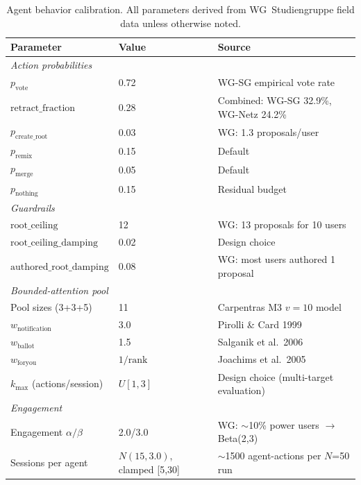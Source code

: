 \documentclass[a4paper, 12pt, twoside]{iviathesis}
\begin{document}
\begin{table}[ht]
\centering
\caption{Agent behavior calibration. All parameters derived from WG~Studiengruppe field data unless otherwise noted.}
\label{tab:sim-calibration}
\small
\begin{tabular}{l l p{5.5cm}}
\toprule
\textbf{Parameter} & \textbf{Value} & \textbf{Source} \\
\midrule
\multicolumn{3}{l}{\textit{Action probabilities}} \\
$p_{\text{vote}}$ & 0.72 & WG-SG empirical vote rate \\
$\text{retract\_fraction}$ & 0.28 & Combined: WG-SG 32.9\%, WG-Netz 24.2\% \\
$p_{\text{create\_root}}$ & 0.03 & WG: 1.3 proposals/user \\
$p_{\text{remix}}$ & 0.15 & Default \\
$p_{\text{merge}}$ & 0.05 & Default \\
$p_{\text{nothing}}$ & 0.15 & Residual budget \\
\midrule
\multicolumn{3}{l}{\textit{Guardrails}} \\
$\text{root\_ceiling}$ & 12 & WG: 13 proposals for 10 users \\
$\text{root\_ceiling\_damping}$ & 0.02 & Design choice \\
$\text{authored\_root\_damping}$ & 0.08 & WG: most users authored 1 proposal \\
\midrule
\multicolumn{3}{l}{\textit{Bounded-attention pool}} \\
Pool sizes (3+3+5) & 11 & Carpentras M3 $v=10$ model \\
$w_{\text{notification}}$ & 3.0 & Pirolli \& Card 1999 \\
$w_{\text{ballot}}$ & 1.5 & Salganik et al.\ 2006 \\
$w_{\text{foryou}}$ & $1/\text{rank}$ & Joachims et al.\ 2005 \\
$k_{\max}$ (actions/session) & $U[1, 3]$ & Design choice (multi-target evaluation) \\
\midrule
\multicolumn{3}{l}{\textit{Engagement}} \\
Engagement $\alpha/\beta$ & 2.0/3.0 & WG: $\sim$10\% power users $\to$ Beta(2,3) \\
Sessions per agent & $N(15, 3.0)$, clamped [5,30] & $\sim$1500 agent-actions per $N$=50 run \\
\bottomrule
\end{tabular}
\end{table}
\end{document}
